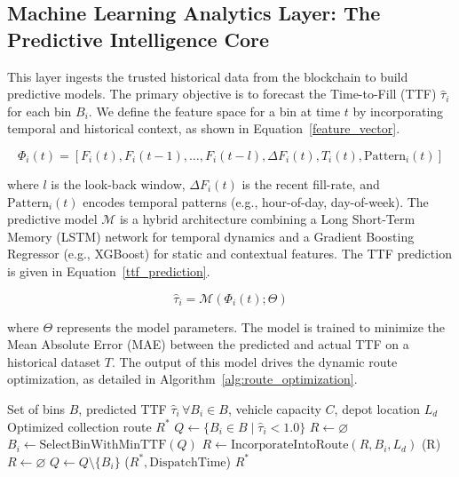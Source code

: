 \documentclass[final,5p,times,twocolumn]{elsarticle}
\begin{document}
\subsection{Machine Learning Analytics Layer: The Predictive Intelligence Core}
This layer ingests the trusted historical data from the blockchain to build predictive models. The primary objective is to forecast the Time-to-Fill (TTF) \( \hat{\tau}_i \) for each bin \( B_i \). We define the feature space for a bin at time \( t \) by incorporating temporal and historical context, as shown in Equation~\ref{feature_vector}.

\begin{equation}
\Phi_i(t) = [ F_i(t), F_i(t-1), \dots, F_i(t-l), \Delta F_i(t), T_i(t), \text{Pattern}_i(t) ]
\label{feature_vector}
\end{equation}

\noindent where \( l \) is the look-back window, \( \Delta F_i(t) \) is the recent fill-rate, and \( \text{Pattern}_i(t) \) encodes temporal patterns (e.g., hour-of-day, day-of-week). The predictive model \( \mathcal{M} \) is a hybrid architecture combining a Long Short-Term Memory (LSTM) network for temporal dynamics and a Gradient Boosting Regressor (e.g., XGBoost) for static and contextual features. The TTF prediction is given in Equation~\ref{ttf_prediction}.

\begin{equation}
\hat{\tau}_i = \mathcal{M}(\Phi_i(t); \Theta)
\label{ttf_prediction}
\end{equation}

\noindent where \( \Theta \) represents the model parameters. The model is trained to minimize the Mean Absolute Error (MAE) between the predicted and actual TTF on a historical dataset \( T \). The output of this model drives the dynamic route optimization, as detailed in Algorithm~\ref{alg:route_optimization}.

\begin{algorithm}[ht]
\caption{Dynamic Route Optimization Based On TTF Prediction}
\label{alg:route_optimization}
\begin{algorithmic}[1]
\REQUIRE Set of bins \(B\), predicted TTF \(\hat{\tau}_i \, \forall B_i \in B\), vehicle capacity \(C\), depot location \(L_d\)
\ENSURE Optimized collection route \(R^*\)
\STATE \(Q \leftarrow \{B_i \in B \mid \hat{\tau}_i < 1.0\}\)
\STATE \(R \leftarrow \varnothing\)
    \STATE \(B_i \leftarrow \text{SelectBinWithMinTTF}(Q)\)
    \STATE \(R \leftarrow \text{IncorporateIntoRoute}(R, B_i, L_d)\)
        \STATE {}(R)
        \STATE \(R \leftarrow \varnothing\)
    \ENDIF
    \STATE \(Q \leftarrow Q \setminus \{B_i\}\)
\ENDWHILE
\STATE {}(\(R^*, \text{DispatchTime}\))
\RETURN \(R^*\)
\end{algorithmic}
\end{algorithm}
\end{document}
